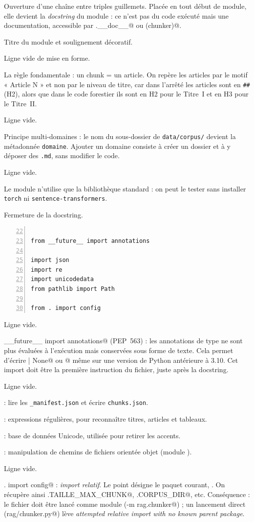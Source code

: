 \documentclass[11pt,a4paper]{article}
\newcommand{\ligne}[1]{\item[\textcolor{num}{L.\,#1}]}
\newenvironment{explication}
  {\begin{description}\setlength{\itemsep}{3pt}\setlength{\parskip}{2pt}}
  {\end{description}}
\newcommand{\fichier}[1]{\texttt{#1}}
\begin{document}
\begin{explication}
\ligne{3} Ouverture d'une chaîne entre triples guillemets. Placée en tout début de module,
elle devient la \emph{docstring} du module : ce n'est pas du code exécuté mais une
documentation, accessible par \Verb@chunker.__doc__@ ou \Verb@help(chunker)@.
\ligne{4--5} Titre du module et soulignement décoratif.
\ligne{6} Ligne vide de mise en forme.
\ligne{7--13} La règle fondamentale : un chunk = un article. On repère les articles par le motif
« Article N » et non par le niveau de titre, car dans l'arrêté les articles sont en
\texttt{\#\#} (H2), alors que dans le code forestier ils sont en H2 pour le Titre~I et en H3
pour le Titre~II.
\ligne{14} Ligne vide.
\ligne{15--18} Principe multi-domaines : le nom du sous-dossier de \fichier{data/corpus/}
devient la métadonnée \texttt{domaine}. Ajouter un domaine consiste à créer un dossier et à y
déposer des \fichier{.md}, sans modifier le code.
\ligne{19} Ligne vide.
\ligne{20} Le module n'utilise que la bibliothèque standard : on peut le tester sans
installer \texttt{torch} ni \texttt{sentence-transformers}.
\ligne{21} Fermeture de la docstring.
\end{explication}

\begin{shaded}
\begin{Verbatim}[numbers=left,firstnumber=22,numbersep=6pt,fontsize=\footnotesize,xleftmargin=1.2em]

from __future__ import annotations

import json
import re
import unicodedata
from pathlib import Path

from . import config
\end{Verbatim}
\end{shaded}

\begin{explication}
\ligne{22} Ligne vide.
\ligne{23} \Verb@from __future__ import annotations@ (PEP~563) : les annotations de type ne sont
plus évaluées à l'exécution mais conservées sous forme de texte. Cela permet d'écrire
\Verb@str | None@ ou @ même sur une version de Python antérieure à 3.10.
Cet import doit être la première instruction du fichier, juste après la docstring.
\ligne{24} Ligne vide.
\ligne{25} \Verb@json@ : lire les \fichier{\_manifest.json} et écrire \fichier{chunks.json}.
\ligne{26} \Verb@re@ : expressions régulières, pour reconnaître titres, articles et tableaux.
\ligne{27} \Verb@unicodedata@ : base de données Unicode, utilisée pour retirer les accents.
\ligne{28} \Verb@Path@ : manipulation de chemins de fichiers orientée objet (module
\Verb@pathlib@).
\ligne{29} Ligne vide.
\ligne{30} \Verb@from . import config@ : \emph{import relatif}. Le point désigne le paquet
courant, \Verb@rag@. On récupère ainsi \Verb@config.TAILLE_MAX_CHUNK@,
\Verb@config.CORPUS_DIR@, etc. Conséquence : le fichier doit être lancé comme module
(\Verb@python -m rag.chunker@) ; un lancement direct (\Verb@python rag/chunker.py@) lève
\emph{attempted relative import with no known parent package}.
\end{explication}
\end{document}
